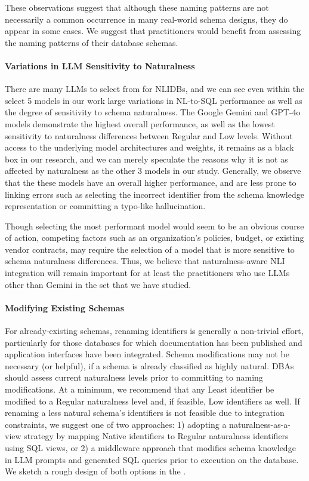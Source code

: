 These observations suggest that although these naming patterns are not necessarily a common occurrence in many real-world schema designs, they do appear in some cases. 
We suggest that practitioners would benefit from assessing the naming patterns of their database schemas.


\paragraph{\textbf{Variations in LLM Sensitivity to Naturalness}}
There are many LLMs to select from for NLIDBs, and we can see even within the select 5 models in our work large variations in NL-to-SQL performance as well as the degree of sensitivity to schema naturalness.
The Google Gemini and GPT-4o models demonstrate the highest overall performance, as well as the lowest sensitivity to naturalness differences between Regular and Low levels.
Without access to the underlying model architectures and weights, it remains as a black box in our research, and we can merely speculate the reasons why it is not as affected by naturalness as the other 3 models in our study.
Generally, we observe that the these models have an overall higher performance, and are less prone to linking errors such as selecting the incorrect identifier from the schema knowledge representation or committing a typo-like hallucination.

Though selecting the most performant model would seem to be an obvious course of action, competing factors such as an organization's policies, budget, or existing vendor contracts, may require the selection of a model that is more sensitive to schema naturalness differences. 
Thus, we believe that naturalness-aware NLI integration will remain important for at least the practitioners who use LLMs other than Gemini in the set that we have studied.


\paragraph{\textbf{Modifying Existing Schemas}}
For already-existing schemas, renaming identifiers is generally a non-trivial effort, particularly for those databases for which documentation has been published and application interfaces have been integrated.
Schema modifications may not be necessary (or helpful), if a schema is already classified as highly natural.
DBAs should assess current naturalness levels prior to committing to naming modifications.
At a minimum, we recommend that any Least identifier be modified to a Regular naturalness level and, if feasible, Low identifiers as well.
If renaming a less natural schema's identifiers is not feasible due to integration constraints, we suggest one of two approaches: 1) adopting a naturalness-as-a-view strategy by mapping Native identifiers to Regular naturalness identifiers using SQL views, or 2) a middleware approach that modifies schema knowledge in LLM prompts and generated SQL queries prior to execution on the database.
We sketch a rough design of both options in the \fi.

